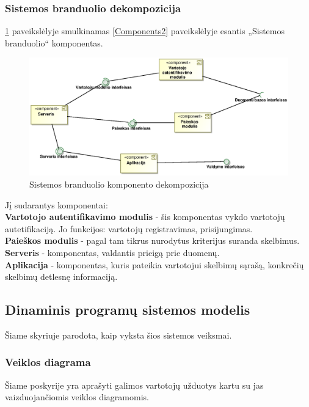 \documentclass[12pt]{article}
\begin{document}
	\subsubsection{Sistemos branduolio dekompozicija}
	\ref{Components3} paveikslėlyje smulkinamas \ref{Components2} paveikslėlyje esantis „Sistemos branduolio“ komponentas.
	\begin{figure}[h]
		\begin{center}
			\includegraphics[width=\textwidth]{Komponentai3.eps}
			\caption{Sistemos branduolio komponento dekompozicija\label{Components3}}
		\end{center}
	\end{figure}

	 Jį sudarantys komponentai:\\
	
	\textbf{Vartotojo autentifikavimo modulis} - šis komponentas vykdo vartotojų autetifikaciją. Jo funkcijos: vartotojų registravimas, prisijungimas.\\
	
	\textbf{Paieškos modulis} - pagal tam tikrus nurodytus kriterijus suranda skelbimus.\\
	
	\textbf{Serveris} - komponentas, valdantis prieigą prie duomenų.\\
	
	\textbf{Aplikacija} - komponentas, kuris pateikia vartotojui skelbimų sąrašą, konkrečių skelbimų detlesnę informaciją.
	\pagebreak

	\subsection{Dinaminis programų sistemos modelis}
	Šiame skyriuje parodota, kaip vyksta šios sistemos veiksmai.
	\subsubsection{Veiklos diagrama}
	Šiame poskyrije yra aprašyti galimos vartotojų užduotys kartu su jas vaizduojančiomis veiklos diagramomis. 
	
\end{document}
